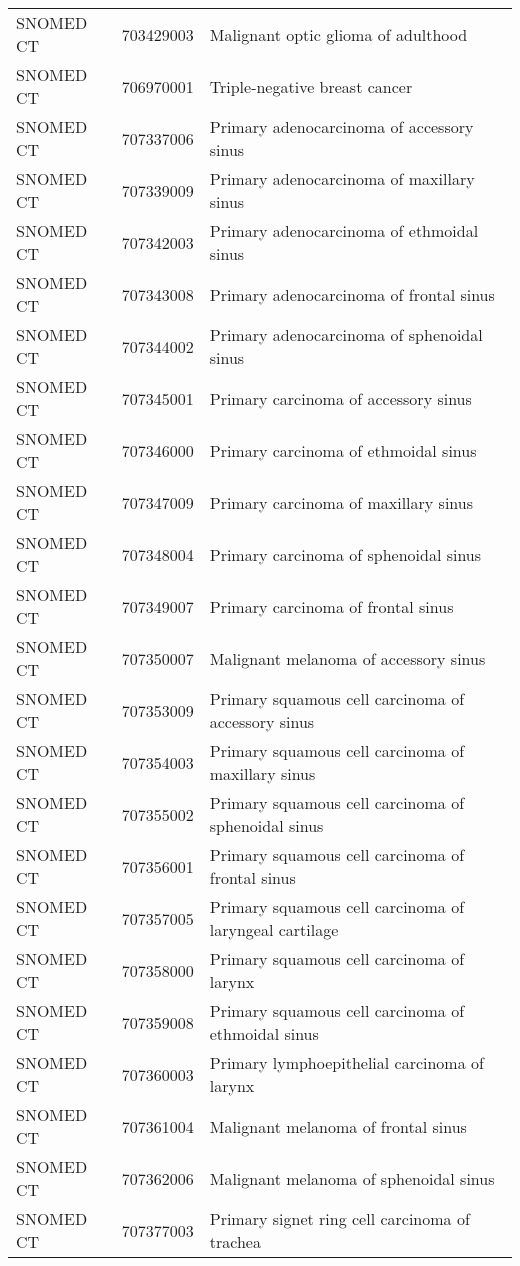 \begin{longtable}{p{}p{}p{}}
  SNOMED CT & 703429003 & Malignant optic glioma of adulthood \\ 
  SNOMED CT & 706970001 & Triple-negative breast cancer \\ 
  SNOMED CT & 707337006 & Primary adenocarcinoma of accessory sinus \\ 
  SNOMED CT & 707339009 & Primary adenocarcinoma of maxillary sinus \\ 
  SNOMED CT & 707342003 & Primary adenocarcinoma of ethmoidal sinus \\ 
  SNOMED CT & 707343008 & Primary adenocarcinoma of frontal sinus \\ 
  SNOMED CT & 707344002 & Primary adenocarcinoma of sphenoidal sinus \\ 
  SNOMED CT & 707345001 & Primary carcinoma of accessory sinus \\ 
  SNOMED CT & 707346000 & Primary carcinoma of ethmoidal sinus \\ 
  SNOMED CT & 707347009 & Primary carcinoma of maxillary sinus \\ 
  SNOMED CT & 707348004 & Primary carcinoma of sphenoidal sinus \\ 
  SNOMED CT & 707349007 & Primary carcinoma of frontal sinus \\ 
  SNOMED CT & 707350007 & Malignant melanoma of accessory sinus \\ 
  SNOMED CT & 707353009 & Primary squamous cell carcinoma of accessory sinus \\ 
  SNOMED CT & 707354003 & Primary squamous cell carcinoma of maxillary sinus \\ 
  SNOMED CT & 707355002 & Primary squamous cell carcinoma of sphenoidal sinus \\ 
  SNOMED CT & 707356001 & Primary squamous cell carcinoma of frontal sinus \\ 
  SNOMED CT & 707357005 & Primary squamous cell carcinoma of laryngeal cartilage \\ 
  SNOMED CT & 707358000 & Primary squamous cell carcinoma of larynx \\ 
  SNOMED CT & 707359008 & Primary squamous cell carcinoma of ethmoidal sinus \\ 
  SNOMED CT & 707360003 & Primary lymphoepithelial carcinoma of larynx \\ 
  SNOMED CT & 707361004 & Malignant melanoma of frontal sinus \\ 
  SNOMED CT & 707362006 & Malignant melanoma of sphenoidal sinus \\ 
  SNOMED CT & 707377003 & Primary signet ring cell carcinoma of trachea \\ 

\end{longtable}
